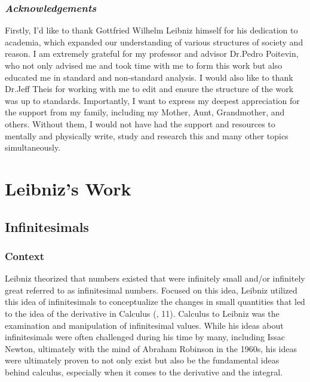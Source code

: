 \documentclass[12pt]{report}
\begin{document}
\section*{\textit{Acknowledgements}}
\begin{itshape}
    Firstly, I'd like to thank Gottfried Wilhelm Leibniz himself for his dedication to academia, which expanded our understanding of various structures of society and reason.\newline \newline
    I am extremely grateful for my professor and advisor Dr.Pedro Poitevin, who not only advised me and took time with me to form this work but also educated me in standard and non-standard analysis.\newline\newline
    I would also like to thank Dr.Jeff Theis for working with me to edit and ensure the structure of the work was up to standards.\newline \newline
    Importantly, I want to express my deepest appreciation for the support from my family, including my Mother, Aunt, Grandmother, and others.
    Without them, I would not have had the support and resources to mentally and physically write, study and research this and many other topics simultaneously.
\end{itshape}
\newpage
\tableofcontents
\newpage

\part{Leibniz's Work}


\chapter{Infinitesimals}

    \section*{Context}
Leibniz theorized that numbers existed that were infinitely small and/or infinitely great referred to as infinitesimal numbers.
Focused on this idea, Leibniz utilized this idea of infinitesimals to conceptualize the changes in small quantities that led to the idea of the derivative in Calculus (, 11).
Calculus to Leibniz was the examination and manipulation of infinitesimal values.
While his ideas about infinitesimals were often challenged during his time by many, including Issac Newton, ultimately with the mind of Abraham Robinson in the 1960s, his ideas were ultimately proven to not only exist but also be the fundamental ideas behind calculus, especially when it comes to the derivative and the integral.
\end{document}
